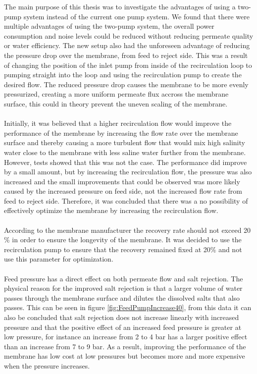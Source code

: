 The main purpose of this thesis was to investigate the advantages of using a two-pump system instead of the current one pump system. We found that there were multiple advantages of using the two-pump system, the overall power consumption and noise levels could be reduced without reducing permeate quality or water efficiency. The new setup also had the unforeseen advantage of reducing the pressure drop over the membrane, from feed to reject side. This was a result of changing the position of the inlet pump from inside of the recirculation loop to pumping straight into the loop and using the recirculation pump to create the desired flow. The reduced pressure drop causes the membrane to be more evenly pressurized, creating a more uniform permeate flux accross the membrane surface, this could in theory prevent the uneven scaling of the membrane.\\
\\
Initially, it was believed that a higher recirculation flow would improve the performance of the membrane by increasing the flow rate over the membrane surface and thereby causing a more turbulent flow that would mix high salinity water close to the membrane with less saline water further from the membrane. However, tests showed that this was not the case. The performance did improve by a small amount, but by increasing the recirculation flow, the pressure was also increased and the small improvements that could be observed was more likely caused by the increased pressure on feed side, not the increased flow rate from feed to reject side. Therefore, it was concluded that there was a no possibility of effectively optimize the membrane by increasing the recirculation flow. \\
\\
According to the membrane manufacturer the recovery rate should not exceed 20 \% in order to ensure the longevity of the membrane. It was decided to use the recirculation pump to ensure that the recovery remained fixed at 20\% and not use this parameter for optimization.\\
\\
Feed pressure has a direct effect on both permeate flow and salt rejection. The physical reason for the improved salt rejection is that a larger volume of water passes through the membrane surface and dilutes the dissolved salts that also passes. This can be seen in figure \ref{fig:FeedPumpIncrease40}, from this data it can also be concluded that salt rejection does not increase linearly with increased pressure and that the positive effect of an increased feed pressure is greater at low pressure, for instance an increase from 2 to 4 bar has a larger positive effect than an increase from 7 to 9 bar. As a result, improving the performance of the membrane has low cost at low pressures but becomes more and more expensive when the pressure increases.\\
